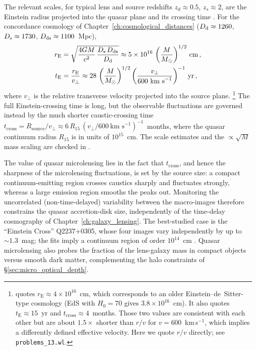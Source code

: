 The relevant scales, for typical lens and source redshifts
$z_d \approx 0.5$, $z_s \approx 2$, are the Einstein radius projected into the
quasar plane and its crossing time
\citep[Sect.~7.1]{schneider_kochanek_wambsganss_2006}.  For the concordance
cosmology of Chapter~\ref{ch:cosmological_distances}
($D_{\mathrm{d}} \approx 1260$, $D_{\mathrm{s}} \approx 1730$, $D_{\mathrm{ds}} \approx 1100$~Mpc),
\begin{align}
    r_{\mathrm{E}} &= \sqrt{\frac{4G M}{c^2}\,
    \frac{D_{\mathrm{s}}\,D_{\mathrm{ds}}}{D_{\mathrm{d}}}}
    \approx 5 \times 10^{16}\,
    \left(\frac{M}{M_{\odot}}\right)^{1/2}\,\text{cm} \,,
    \label{eq:micro_qso_rE} \\
    t_{\mathrm{E}} &= \frac{r_{\mathrm{E}}}{v_\perp} \approx 28\,
    \left(\frac{M}{M_{\odot}}\right)^{1/2}
    \left(\frac{v_\perp}{600~\text{km s}^{-1}}\right)^{-1}\,\text{yr} \,,
    \label{eq:micro_qso_tE}
\end{align}
where $v_\perp$ is the relative transverse velocity projected into the
source plane.%
\footnote{\citet[Part~4, Sect.~7.1]{schneider_kochanek_wambsganss_2006} quotes
$r_{\mathrm{E}} \approx 4\times10^{16}$~cm, which corresponds to an older
Einstein--de~Sitter-type cosmology (EdS with $H_0 = 70$ gives
$3.8\times10^{16}$~cm).  It also quotes $t_{\mathrm{E}} \approx 15$~yr and
$t_{\mathrm{cross}} \approx 4$~months.  Those two values are consistent with
each other but are about $1.5\times$ shorter than $r/v$ for
$v = 600$~km\,s$^{-1}$, which implies a differently defined effective velocity.
Here we quote $r/v$ directly; see \texttt{problems\_13.wl}.}
The full Einstein-crossing time is long, but the observable
fluctuations are governed instead by the much shorter caustic-crossing
time $t_{\mathrm{cross}} = R_{\mathrm{source}}/v_\perp \approx 6\,R_{15}\,
(v_\perp/600~\text{km s}^{-1})^{-1}$~months, where the quasar continuum radius
$R_{15}$ is in units of $10^{15}$~cm.  The scale estimates and the
$\propto\sqrt{M}$ mass scaling are checked in
.

The value of quasar microlensing lies in the fact that $t_{\mathrm{cross}}$,
and hence the sharpness of the microlensing fluctuations, is set by the
source size: a compact continuum-emitting region crosses caustics
sharply and fluctuates strongly, whereas a large emission region smooths the
peaks out.  Monitoring the uncorrelated (non-time-delayed) variability between
the macro-images therefore constrains the quasar accretion-disk size,
independently of the time-delay cosmography of Chapter~\ref{ch:galaxy_lensing}.
The best-studied case is the ``Einstein Cross'' Q2237$+$0305, whose four
images vary independently by up to $\sim\!1.3$~mag; the fits imply a continuum
region of order $10^{14}$~cm
\citep[Sect.~7.3]{schneider_kochanek_wambsganss_2006}.  Quasar microlensing
also probes the fraction of the lens-galaxy mass in compact objects versus
smooth dark matter, complementing the halo constraints of
\S\ref{sec:micro_optical_depth}.


